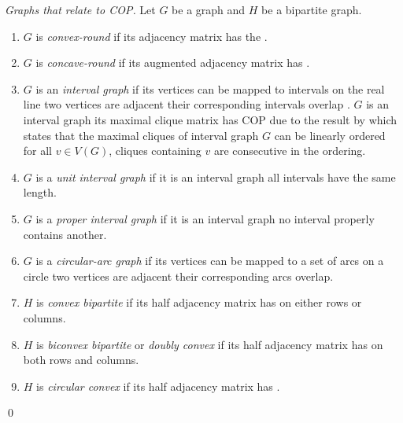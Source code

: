 \begin{definition}{\emph{Graphs that relate to
      COP.\cite[Def.~2.5]{d08phd}}} %
   \label{def:graphwithcop} %
   Let $G$ be a graph and $H$ be a bipartite graph.

   \begin{enumerate}
   \item $G$ is \emph{convex-round} if its adjacency matrix has the
     \CROP.
   \item \label{def::concave-round} $G$ is \emph{concave-round} if its augmented adjacency matrix
     has \CROP.  
   \item $G$ is an \emph{interval graph} if its vertices can be mapped
     to intervals on the real line \stt two vertices are adjacent \iff
     their corresponding intervals overlap .
     $G$ is an interval graph \iff its maximal clique matrix has COP
     due to the result by \cite{gh64} which states that the maximal
     cliques of interval graph $G$ can be linearly ordered \stt for
     all $v \in V(G)$, cliques containing $v$ are consecutive in the
     ordering.
   \item $G$ is a \emph{unit interval graph} if it is an interval
     graph \stt all intervals have the same length.
   \item $G$ is a \emph{proper interval graph} if it is an interval
     graph \stt no interval properly contains another.
   \item $G$ is a \emph{circular-arc graph} if its vertices can be
     mapped to a set of arcs on a circle \stt two vertices are
     adjacent \iff their corresponding arcs overlap.
   \item $H$ is \emph{convex bipartite} if its half adjacency matrix
     has \COP on either rows or columns.
   \item $H$ is \emph{biconvex bipartite} or \emph{doubly
       convex}\cite{yc95} if its half adjacency matrix has \COP on
     both rows and columns.
   \item $H$ is \emph{circular convex} if its half adjacency matrix
     has \CROP.
   \end{enumerate}
\end{definition}
\qed




